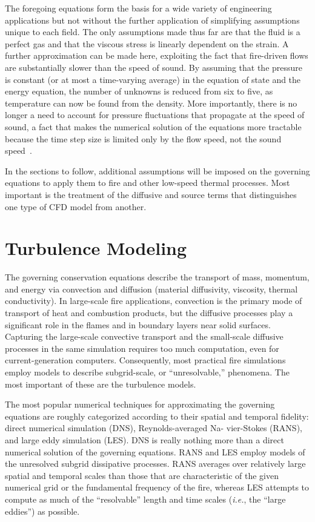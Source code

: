 \documentclass[graybox]{svmult}
\begin{document}
The foregoing equations form the basis for a wide variety of engineering applications but not without the further application of simplifying assumptions unique to each field. The only assumptions made thus far are that the fluid is a perfect gas and that the viscous stress is linearly dependent on the strain. A further approximation can be made here, exploiting the fact that fire-driven flows are substantially slower than the speed of sound. By assuming that the pressure is constant (or at most a time-varying average) in the equation of state and the energy equation, the number of unknowns is reduced from six to five, as temperature can now be found from the density. More importantly, there is no longer a need to account for pressure fluctuations that propagate at the speed of sound, a fact that makes the numerical solution of the equations more tractable because the time step size is limited only by the flow speed, not the sound speed~\cite{Rehm}.

In the sections to follow, additional assumptions will be imposed on the governing equations to apply them to fire and other low-speed thermal processes. Most important is the treatment of the diffusive and source terms that distinguishes one type of CFD model from another.


\section{Turbulence Modeling}

The governing conservation equations describe the transport of mass, momentum, and energy via convection and diffusion (material diffusivity, viscosity, thermal conductivity). In large-scale fire applications, convection is the primary mode of transport of heat and combustion products, but the diffusive processes play a significant role in the flames and in boundary layers near solid surfaces. Capturing the large-scale convective transport and the small-scale diffusive processes in the same simulation requires too much computation, even for current-generation computers. Consequently, most practical fire simulations employ models to describe subgrid-scale, or ``unresolvable,'' phenomena. The most important of these are the turbulence models.

The most popular numerical techniques for approximating the governing equations are roughly categorized according to their spatial and temporal fidelity: direct numerical simulation (DNS), Reynolds-averaged Na- vier-Stokes (RANS), and large eddy simulation (LES). DNS is really nothing more than a direct numerical solution of the governing equations. RANS and LES employ models of the unresolved subgrid dissipative processes. RANS averages over relatively large spatial and temporal scales than those that are characteristic of the given numerical grid or the fundamental frequency of the fire, whereas LES attempts to compute as much of the ``resolvable'' length and time scales ({\em i.e.}, the ``large eddies'') as possible.
\end{document}
